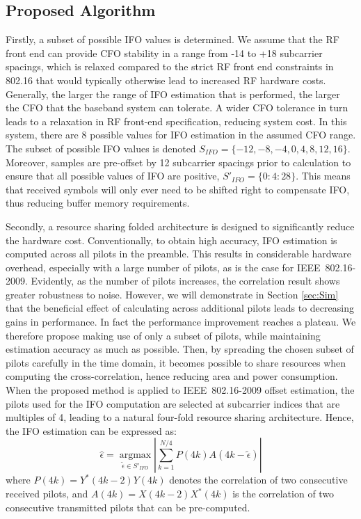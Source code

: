 \subsection{Proposed Algorithm}
Firstly, a subset of possible IFO values is determined.
We assume that the RF front end can provide CFO stability in a range from -14 to +18 subcarrier spacings, which is relaxed compared to the strict RF front end constraints in 802.16 that would typically otherwise lead to increased RF hardware costs.
Generally, the larger the range of IFO estimation that is performed, the larger the CFO that the baseband system can tolerate.
A wider CFO tolerance in turn leads to a relaxation in RF front-end specification, reducing system cost.
In this system, there are 8 possible values for IFO estimation in the assumed CFO range.
The subset of possible IFO values is denoted $S_{IFO} = \{-12, -8, -4, 0, 4, 8, 12, 16\}$.  Moreover, samples are pre-offset by 12 subcarrier spacings prior to calculation to ensure that all possible values of IFO are positive, $S'_{IFO} = \{0:4:28\}$.
This means that received symbols will only ever need to be shifted right to compensate IFO, thus reducing buffer memory requirements.

Secondly, a resource sharing folded architecture is designed to significantly reduce the hardware cost.
Conventionally, to obtain high accuracy, IFO estimation is computed across all pilots in the preamble.
This results in considerable hardware overhead, especially with a large number of pilots, as is the case for IEEE~802.16-2009.
Evidently, as the number of pilots increases, the correlation result shows greater robustness to noise.
However, we will demonstrate in Section \ref{sec:Sim} that the beneficial effect of calculating across additional pilots leads to decreasing gains in performance.
In fact the performance improvement reaches a plateau.
We therefore propose making use of only a subset of pilots, while maintaining estimation accuracy as much as possible.
Then, by spreading the chosen subset of pilots carefully in the time domain, it becomes possible to share resources when computing the cross-correlation, hence reducing area and power consumption.
When the proposed method is applied to IEEE~802.16-2009 offset estimation, the pilots used for the IFO computation are selected at subcarrier indices that are multiples of 4, leading to a natural four-fold resource sharing architecture. 
Hence, the IFO estimation can be expressed as:
\begin{equation}
\label{integerCFOprop}
\hat{\epsilon} =\underset{\tilde{\epsilon} \in S'_{IFO}}{\operatorname{argmax}}  \left|\sum_{k=1}^{N/4} P(4k)  A(4k-\tilde{\epsilon})\right|
\end{equation}
where $P(4k) = Y^{*}(4k-2) Y(4k)$ denotes the correlation of two consecutive received pilots, and $A(4k) = X(4k-2) X^{*}(4k)$ is the correlation of two consecutive transmitted pilots that can be pre-computed.

